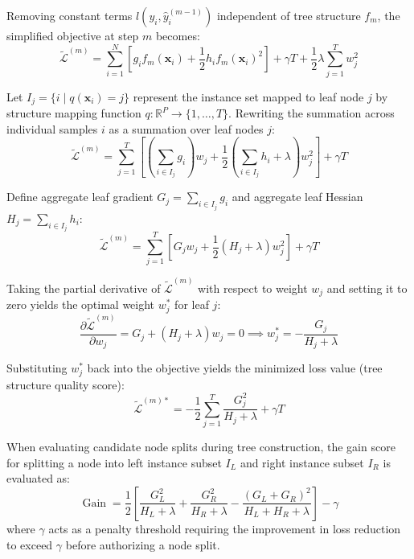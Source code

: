 Removing constant terms $l(y_i, \hat{y}_i^{(m-1)})$ independent of tree structure $f_m$, the simplified objective at step $m$ becomes:
\begin{equation}
\tilde{\mathcal{L}}^{(m)} = \sum_{i=1}^N \left[ g_i f_m(\mathbf{x}_i) + \frac{1}{2} h_i f_m(\mathbf{x}_i)^2 \right] + \gamma T + \frac{1}{2} \lambda \sum_{j=1}^T w_j^2
\label{eq:ch3_xgb_simplified_obj}
\end{equation}

Let $I_j = \{i \mid q(\mathbf{x}_i) = j\}$ represent the instance set mapped to leaf node $j$ by structure mapping function $q: \mathbb{R}^P \to \{1, \dots, T\}$. Rewriting the summation across individual samples $i$ as a summation over leaf nodes $j$:
\begin{equation}
\tilde{\mathcal{L}}^{(m)} = \sum_{j=1}^T \left[ \left( \sum_{i \in I_j} g_i \right) w_j + \frac{1}{2} \left( \sum_{i \in I_j} h_i + \lambda \right) w_j^2 \right] + \gamma T
\label{eq:ch3_xgb_grouped_obj}
\end{equation}

Define aggregate leaf gradient $G_j = \sum_{i \in I_j} g_i$ and aggregate leaf Hessian $H_j = \sum_{i \in I_j} h_i$:
\begin{equation}
\tilde{\mathcal{L}}^{(m)} = \sum_{j=1}^T \left[ G_j w_j + \frac{1}{2} (H_j + \lambda) w_j^2 \right] + \gamma T
\end{equation}

Taking the partial derivative of $\tilde{\mathcal{L}}^{(m)}$ with respect to weight $w_j$ and setting it to zero yields the optimal weight $w_j^*$ for leaf $j$:
\begin{equation}
\frac{\partial \tilde{\mathcal{L}}^{(m)}}{\partial w_j} = G_j + (H_j + \lambda) w_j = 0 \implies w_j^* = -\frac{G_j}{H_j + \lambda}
\label{eq:ch3_xgb_optimal_w}
\end{equation}

Substituting $w_j^*$ back into the objective yields the minimized loss value (tree structure quality score):
\begin{equation}
\tilde{\mathcal{L}}^{(m)*} = -\frac{1}{2} \sum_{j=1}^T \frac{G_j^2}{H_j + \lambda} + \gamma T
\label{eq:ch3_xgb_structure_score}
\end{equation}

When evaluating candidate node splits during tree construction, the gain score for splitting a node into left instance subset $I_L$ and right instance subset $I_R$ is evaluated as:
\begin{equation}
\operatorname{Gain} = \frac{1}{2} \left[ \frac{G_L^2}{H_L + \lambda} + \frac{G_R^2}{H_R + \lambda} - \frac{(G_L + G_R)^2}{H_L + H_R + \lambda} \right] - \gamma
\label{eq:ch3_xgb_gain}
\end{equation}
where $\gamma$ acts as a penalty threshold requiring the improvement in loss reduction to exceed $\gamma$ before authorizing a node split.

